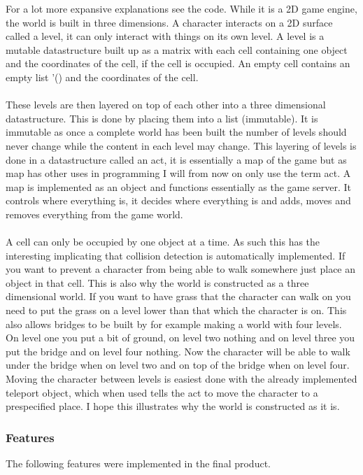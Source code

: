 \documentclass[12pt,a4paper]{article}
\begin{document}
For a lot more expansive explanations see the code.
While it is a 2D game engine, the world is built in three dimensions.
A character interacts on a 2D surface called a level, it can only interact with things on its own level.
A level is a mutable datastructure built up as a matrix with each cell containing one object and the coordinates of the cell, if the cell is occupied. An empty cell contains an empty list '() and the coordinates of the cell. 
\\
\\
These levels are then layered on top of each other into a three dimensional datastructure. This is done by placing them into a list (immutable). It is immutable as once a complete world has been built the number of levels should never change while the content in each level may change.
This layering of levels is done in a datastructure called an act, it is essentially a map of the game but as map has other uses in programming I will from now on only use the term act. A map is implemented as an object and functions essentially as the game server. It controls where everything is, it decides where everything is and adds, moves and removes everything from the game world.
\\
\\
A cell can only be occupied by one object at a time. As such this has the interesting implicating that collision detection is automatically implemented. If you want to prevent a character from being able to walk somewhere just place an object in that cell. This is also why the world is constructed as a three dimensional world. If you want to have grass that the character can walk on you need to put the grass on a level lower than that which the character is on. This also allows bridges to be built by for example making a world with four levels. On level one you put a bit of ground, on level two nothing and on level three you put the bridge and on level four nothing.
Now the character will be able to walk under the bridge when on level two and on top of the bridge when on level four. Moving the character between levels is easiest done with the already implemented teleport object, which when used tells the act to move the character to a prespecified place.
I hope this illustrates why the world is constructed as it is.

\subsubsection{Features}
The following features were implemented in the final product.
\end{document}
